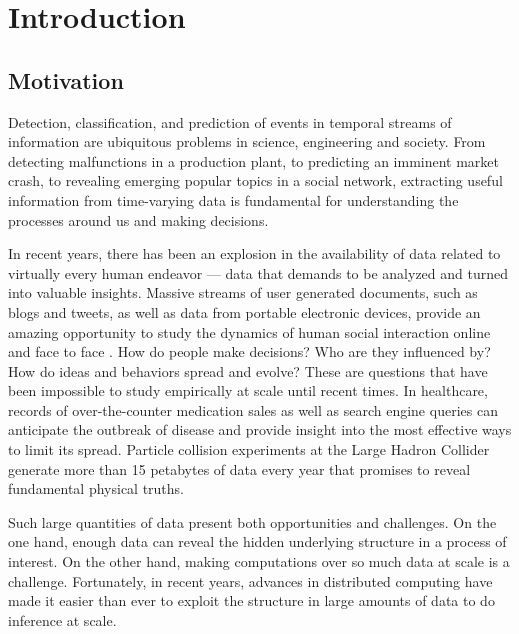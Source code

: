 \chapter{Introduction}
\label{ch:intro}
\section{Motivation}

Detection, classification, and prediction of events in temporal streams of
information are ubiquitous problems in science, engineering and society. From
detecting malfunctions in a production plant, to predicting an imminent market
crash, to revealing emerging popular topics in a social network, extracting
useful information from time-varying data is fundamental for understanding the
processes around us and making decisions.

In recent years, there has been an explosion in the availability of data related
to virtually every human endeavor --- data that demands to be analyzed and
turned into valuable insights. Massive streams of user generated documents, such
as blogs and tweets, as well as data from portable electronic devices, provide
an amazing opportunity to study the dynamics of human social interaction online
and face to face \cite{Pentland1}\cite{Pentland2}. How do people make decisions?
Who are they influenced by? How do ideas and behaviors spread and evolve? These
are questions that have been impossible to study empirically at scale until
recent times. In healthcare, records of over-the-counter medication
sales \cite{Wagner} as well as search engine queries \cite{Xu} can anticipate the
outbreak of disease and provide insight into the most effective ways to limit
its spread. Particle collision experiments at the Large Hadron Collider generate
more than 15 petabytes of data \cite{Andreeva} every year that promises to reveal
fundamental physical truths.

Such large quantities of data present both opportunities and challenges. On the
one hand, enough data can reveal the hidden underlying structure in a process of
interest. On the other hand, making computations over so much data at scale is a
challenge. Fortunately, in recent years, advances in distributed computing have
made it easier than ever to exploit the structure in large amounts of data to do
inference at scale.

